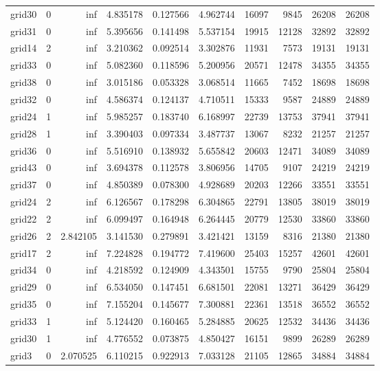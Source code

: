 \begin{longtable}{|l|r|r|r|r|r|r|r|r|r|}
grid30 & 0 & inf & 4.835178 & 0.127566 & 4.962744 & 16097 & 9845 & 26208 & 26208 \\
grid31 & 0 & inf & 5.395656 & 0.141498 & 5.537154 & 19915 & 12128 & 32892 & 32892 \\
grid14 & 2 & inf & 3.210362 & 0.092514 & 3.302876 & 11931 & 7573 & 19131 & 19131 \\
grid33 & 0 & inf & 5.082360 & 0.118596 & 5.200956 & 20571 & 12478 & 34355 & 34355 \\
grid38 & 0 & inf & 3.015186 & 0.053328 & 3.068514 & 11665 & 7452 & 18698 & 18698 \\
grid32 & 0 & inf & 4.586374 & 0.124137 & 4.710511 & 15333 & 9587 & 24889 & 24889 \\
grid24 & 1 & inf & 5.985257 & 0.183740 & 6.168997 & 22739 & 13753 & 37941 & 37941 \\
grid28 & 1 & inf & 3.390403 & 0.097334 & 3.487737 & 13067 & 8232 & 21257 & 21257 \\
grid36 & 0 & inf & 5.516910 & 0.138932 & 5.655842 & 20603 & 12471 & 34089 & 34089 \\
grid43 & 0 & inf & 3.694378 & 0.112578 & 3.806956 & 14705 & 9107 & 24219 & 24219 \\
grid37 & 0 & inf & 4.850389 & 0.078300 & 4.928689 & 20203 & 12266 & 33551 & 33551 \\
grid24 & 2 & inf & 6.126567 & 0.178298 & 6.304865 & 22791 & 13805 & 38019 & 38019 \\
grid22 & 2 & inf & 6.099497 & 0.164948 & 6.264445 & 20779 & 12530 & 33860 & 33860 \\
grid26 & 2 & 2.842105 & 3.141530 & 0.279891 & 3.421421 & 13159 & 8316 & 21380 & 21380 \\
grid17 & 2 & inf & 7.224828 & 0.194772 & 7.419600 & 25403 & 15257 & 42601 & 42601 \\
grid34 & 0 & inf & 4.218592 & 0.124909 & 4.343501 & 15755 & 9790 & 25804 & 25804 \\
grid29 & 0 & inf & 6.534050 & 0.147451 & 6.681501 & 22081 & 13271 & 36429 & 36429 \\
grid35 & 0 & inf & 7.155204 & 0.145677 & 7.300881 & 22361 & 13518 & 36552 & 36552 \\
grid33 & 1 & inf & 5.124420 & 0.160465 & 5.284885 & 20625 & 12532 & 34436 & 34436 \\
grid30 & 1 & inf & 4.776552 & 0.073875 & 4.850427 & 16151 & 9899 & 26289 & 26289 \\
grid3 & 0 & 2.070525 & 6.110215 & 0.922913 & 7.033128 & 21105 & 12865 & 34884 & 34884 \\

\end{longtable}
